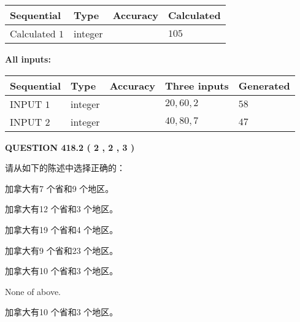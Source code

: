 \documentclass{ctexart}
\begin{document}
  
\noindent\begin{tabular}{|l|l|l|l|}
\hline
 Sequential & Type & Accuracy & Calculated \\ 
\hline
 
 
  Calculated $  1 $ & integer &  & 
  $ 105 $ 
 \\  \hline  
 \end{tabular}
   
   
   
   
\noindent\vspace{0.1in}\hspace{-0.08in} {\textbf{\Large{All inputs: }}}
   
   
  
  
\noindent\begin{tabular}{|l|l|l|l|l|}
\hline
 Sequential & Type & Accuracy & Three inputs & Generated \\ 
\hline
 
 
  INPUT $  1 $ & integer &  & $
 20
 , 
 60
 , 
 2
 $ & $ 58 $ 
 \\  \hline  
 
 
  INPUT $  2 $ & integer &  & $
 40
 , 
 80
 , 
 7
 $ & $ 47 $ 
 \\  \hline  
 \end{tabular}
   
   
  
\vspace{0.2in}
  
{\textbf{\Large{QUESTION
418.2 
 ( 2 , 2 , 3 )
}}}
  
  
请从如下的陈述中选择正确的：
 
 
加拿大有7 个省和9 个地区。
 
 
加拿大有12 个省和3 个地区。
 
 
加拿大有19 个省和4 个地区。
 
 
加拿大有9 个省和23 个地区。
 
 
加拿大有10 个省和3 个地区。
 
 
 None of above.
 
 
\noindent{}
 
 
加拿大有10 个省和3 个地区。
 
 
\noindent{}
 
\end{document}
